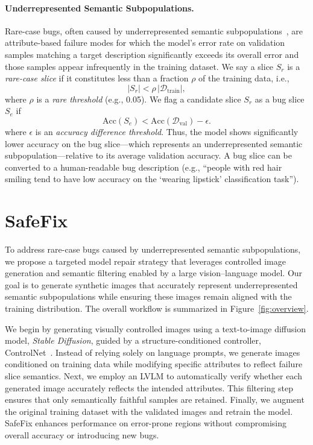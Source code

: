 \documentclass[10pt]{article} %
\newcommand{\model}{SafeFix\xspace}
\newcommand{\controlnet}{ControlNet\xspace}
\begin{document}
\paragraph{Underrepresented Semantic Subpopulations.} Rare-case bugs, often caused by underrepresented semantic subpopulations~\citep{eyuboglu2022rare}, are attribute-based failure modes for which the model’s error rate on validation samples matching a target description significantly exceeds its overall error and those samples appear infrequently in the training dataset. We say a slice \(S_r\) is a \emph{rare-case slice} if it constitutes less than a fraction \(\rho\) of the training data, i.e., 
\begin{equation}
|S_r| < \rho \,\bigl|\mathcal{D}_{\mathrm{train}}\bigr|,
\label{eq:rare}
\end{equation}
where \(\rho\) is a \emph{rare threshold} (e.g., 0.05). We flag a candidate slice \(S_r\) as a bug slice \(S_e\) if  
\begin{equation}
\mathrm{Acc}(S_{e}) < \mathrm{Acc}(\mathcal{D}_{\mathrm{val}}) - \epsilon.
\label{eq:low_acc_and_rare}
\end{equation}
where \(\epsilon\) is an \emph{accuracy difference threshold}. Thus, the model shows significantly lower accuracy on the bug slice—which represents an underrepresented semantic subpopulation—relative to its average validation accuracy. A bug slice can be converted to a human-readable bug description (e.g., “people with red hair smiling tend to have low accuracy on the ‘wearing lipstick’ classification task”).





\section{\model}
To address rare-case bugs caused by underrepresented semantic subpopulations, we propose a targeted model repair strategy that leverages controlled image generation and semantic filtering enabled by a large vision--language model. Our goal is to generate synthetic images that accurately represent underrepresented semantic subpopulations while ensuring these images remain aligned with the training distribution. The overall workflow is summarized in Figure~\ref{fig:overview}.

We begin by generating visually controlled images using a text-to-image diffusion model, \textit{Stable Diffusion}, guided by a structure-conditioned controller, \controlnet{}~\citep{zhang2023adding}. Instead of relying solely on language prompts, we generate images conditioned on training data while modifying specific attributes to reflect failure slice semantics. Next, we employ an LVLM to automatically verify whether each generated image accurately reflects the intended attributes. This filtering step ensures that only semantically faithful samples are retained. Finally, we augment the original training dataset with the validated images and retrain the model. \model enhances performance on error-prone regions without compromising overall accuracy or introducing new bugs.
\end{document}
